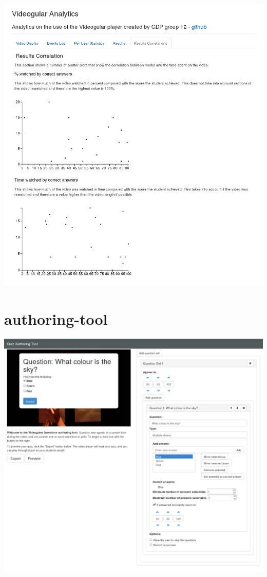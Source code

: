 \includegraphics[width=\textwidth]{screenshots/videogular-analytics-results-correlations.png}

\section{authoring-tool}

\includegraphics[width=\textwidth]{screenshots/authoring-tool.png}
